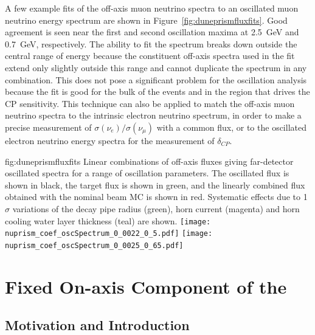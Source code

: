 A few example fits of the off-axis  muon neutrino spectra to an oscillated   muon neutrino energy spectrum are shown in Figure~\ref{fig:duneprismfluxfits}. Good agreement is seen near the first and second oscillation maxima at 2.5~GeV and 0.7~GeV, respectively. The ability to fit the  spectrum breaks down outside the central range of energy because the constituent off-axis spectra used in the fit extend only slightly outside this range and cannot duplicate the spectrum in any combination.  This does not pose a significant problem for the oscillation analysis because the fit is good for the bulk of the events and in the region that drives the CP sensitivity.  This technique can also be applied to match the off-axis muon neutrino spectra to the   intrinsic electron neutrino spectrum, in order to make a precise measurement of $\sigma(\nu_e)/\sigma(\nu_\mu)$ with a common flux, or to the   oscillated electron neutrino energy spectra for the measurement of $\delta_{CP}$.

\begin{dunefigure}{fig:duneprismfluxfits}
{Linear combinations of off-axis fluxes giving far-detector oscillated spectra for a range of oscillation parameters. The   oscillated flux is shown in black, the target flux is shown in green, and the linearly combined flux obtained with the nominal beam MC is shown in red. Systematic effects due to 1 $\sigma$ variations of the decay pipe radius (green), horn current (magenta) and horn cooling water layer thickness (teal) are shown.}
	\texttt{[image: nuprism\_coef\_oscSpectrum\_0\_0022\_0\_5.pdf]}
	\texttt{[image: nuprism\_coef\_oscSpectrum\_0\_0025\_0\_65.pdf]}
\end{dunefigure}

\section{Fixed On-axis Component of the  }

\subsection{Motivation and Introduction}
\label{sec:appx-nd:exsum-nd-onaxis-mission}

